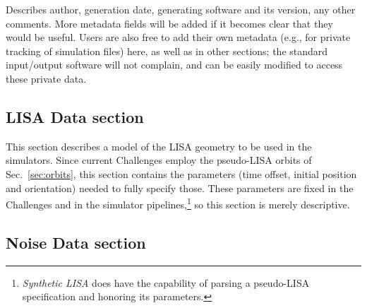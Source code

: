 \documentclass[11pt]{report}
\begin{document}
Describes author, generation date, generating software and its version, any other comments. More metadata fields will be added
if it becomes clear that they would be useful. Users are also
free to add their own metadata (e.g., for private tracking
of simulation files) here, as well as in other sections; the standard input/output software will not complain, and can be easily modified
to access these private data.

\subsection{LISA Data section}

This section describes a model of the LISA geometry to be used in the simulators. Since current Challenges employ the pseudo-LISA orbits of Sec.\ \ref{sec:orbits}, this section contains the parameters (time offset, initial position and orientation) needed to fully specify those. These parameters are fixed in the Challenges and in the simulator pipelines,\footnote{\emph{Synthetic LISA} does have the capability of parsing a pseudo-LISA specification and honoring its parameters.} so this section is merely descriptive.


\subsection{Noise Data section}
\end{document}
